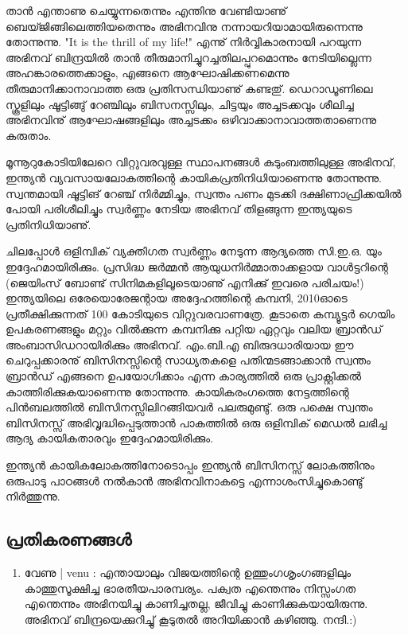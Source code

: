 ﻿
\vskip 2pt
\enlargethispage*{2\baselineskip}

താന്‍ എന്താണു ചെയ്യുന്നതെന്നും എന്തിനു വേണ്ടിയാണു് ബെയ്ജിങ്ങിലെത്തിയതെന്നും അഭിനവിനു നന്നായറിയാമായിരുന്നെന്നു തോന്നുന്നു. "It is the thrill of my life!" എന്നു് നിര്‍വ്വികാരനായി പറയുന്ന അഭിനവ് ബിന്ദ്രയില്‍ താന്‍ തീരുമാനിച്ചുറച്ചതിലപ്പുറമൊന്നും നേടിയില്ലെന്ന അഹങ്കാരത്തെക്കാളും, എങ്ങനെ ആഘോഷിക്കണമെന്നു തീരുമാനിക്കാനാവാത്ത ഒരു പ്രതിസന്ധിയാണു് കണ്ടതു്. ഡെറാഡൂണിലെ സ്കൂളിലും ഷൂട്ടിങ്ങു് റേഞ്ചിലും ബിസനസ്സിലും, ചിട്ടയും അച്ചടക്കവും ശീലിച്ച അഭിനവിനു് ആഘോഷങ്ങളിലും അച്ചടക്കം ഒഴിവാക്കാനാവാത്തതാണെന്നു കരുതാം.

മൂന്നൂറുകോടിയിലേറെ വിറ്റുവരവുള്ള സ്ഥാപനങ്ങള്‍ കുടുംബത്തിലുള്ള അഭിനവ്, ഇന്ത്യന്‍ വ്യവസായലോകത്തിന്റെ കായികപ്രതിനിധിയാണെന്നു തോന്നുന്നു. സ്വന്തമായി ഷൂട്ടിങ് റേഞ്ച് നിര്‍മ്മിച്ചും, സ്വന്തം പണം മുടക്കി ദക്ഷിണാഫ്രിക്കയില്‍ പോയി പരിശീലിച്ചും സ്വര്‍ണ്ണം നേടിയ അഭിനവ് തിളങ്ങുന്ന ഇന്ത്യയുടെ പ്രതിനിധിയാണു്.

ചിലപ്പോള്‍ ഒളിമ്പിക് വ്യക്തിഗത സ്വര്‍ണ്ണം നേടുന്ന ആദ്യത്തെ സി.ഇ.ഒ. യും ഇദ്ദേഹമായിരിക്കും. പ്രസിദ്ധ ജര്‍മ്മന്‍ ആയുധനിര്‍മ്മാതാക്കളായ വാള്‍ട്ടറിന്റെ (ജെയിംസ് ബോണ്ട് സിനിമകളിലൂടെയാണു് എനിക്കു് ഇവരെ പരിചയം!) ഇന്ത്യയിലെ ഒരേയൊരേജന്റായ അദ്ദേഹത്തിന്റെ കമ്പനി, 2010ഓടെ പ്രതീക്ഷിക്കുന്നത് 100 കോടിയുടെ വിറ്റുവരവാണത്രേ. കൂടാതെ കമ്പ്യൂട്ടര്‍ ഗെയിം ഉപകരണങ്ങളും മറ്റും വില്‍ക്കുന്ന കമ്പനിക്കു പറ്റിയ ഏറ്റവും വലിയ ബ്രാന്‍ഡ് അംബാസിഡറായിരിക്കും അഭിനവ്. എം.ബി.എ ബിരുദധാരിയായ ഈ ചെറുപ്പക്കാരനു് ബിസിനസ്സിന്റെ സാധ്യതകളെ പതിന്മടങ്ങാക്കാന്‍ സ്വന്തം ബ്രാന്‍ഡ് എങ്ങനെ ഉപയോഗിക്കാം എന്ന കാര്യത്തില്‍ ഒരു പ്രാക്റ്റിക്കല്‍ കാത്തിരിക്കുകയാണെന്നു തോന്നുന്നു. കായികരംഗത്തെ നേട്ടത്തിന്റെ പിന്‍ബലത്തില്‍ ബിസിനസ്സിലിറങ്ങിയവര്‍ പലരുമുണ്ടു്. ഒരു പക്ഷെ സ്വന്തം ബിസിനസ്സ് അഭിവൃദ്ധിപ്പെടുത്താന്‍ പാകത്തില്‍ ഒരു ഒളിമ്പിക് മെഡല്‍ ലഭിച്ച ആദ്യ കായികതാരവും ഇദ്ദേഹമായിരിക്കും.

ഇന്ത്യന്‍ കായികലോകത്തിനോടൊപ്പം ഇന്ത്യന്‍ ബിസിനസ്സ് ലോകത്തിനും ഒരുപാടു പാഠങ്ങള്‍ നല്‍കാന്‍ അഭിനവിനാകട്ടെ എന്നാശംസിച്ചുകൊണ്ടു് നിര്‍ത്തുന്നു.

\subsection*{പ്രതികരണങ്ങള്‍}
\begin{enumerate}
\item{വേണു | venu : }
എന്തായാലും വിജയത്തിന്റെ ഉത്തുംഗശൃംഗങ്ങളിലും കാത്തുസൂക്ഷിച്ച ഭാരതീയപാരമ്പര്യം. പക്വത എന്തെന്നും നിസ്സംഗത എന്തെന്നും അഭിനയിച്ചു കാണിച്ചതല്ല, ജീവിച്ചു കാണിക്കുകയായിരുന്നു. അഭിനവ് ബിന്ദ്രയെക്കുറിച്ചു് കൂടുതല്‍ അറിയിക്കാന്‍ കഴിഞ്ഞു. നന്ദി.:)

\end{enumerate}

\newpage
